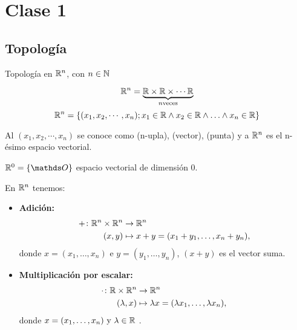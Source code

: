 \chapter{Clase 1}

\section{Topología}

Topología en $\mathbb{R}^{n}$, con $n \in \mathbb{N}$

$$
	\mathbb{R}^{n} =  \underbrace{\mathbb{R} \times \mathbb{R} \times \cdots \mathbb{R} }_{n \text{veces}}
$$
$$
	\mathbb{R}^{n} = \{ (x_1, x_2, \cdots, x_n); x_1 \in \mathbb{R} \wedge  x_2 \in \mathbb{R} \wedge
	\ldots  \wedge  x_n \in \mathbb{R}       \}
$$

Al $(x_1, x_2, \cdots, x_n) $  se conoce como (n-upla), (vector), (punta) y a $\mathbb{R}^{n}$ es el n-ésimo espacio vectorial.

$\Real{0} = \{\Ou\}$  espacio vectorial de dimensión $0$.

En $\mathbb{R}^{n}$ tenemos:

\begin{itemize}
	\item \textbf{Adición:}
	      \begin{align*}
		      +\colon \mathbb{R}^{n} \times \mathbb{R}^{n} & \to \mathbb{R}^{n}                                        \\
		      (x, y)                 & \mapsto x + y = (x_1 + y_1, \dots, x_n + y_n),
	      \end{align*}
	      donde $x = (x_1, \dots, x_n)$ e $y = (y_1, \dots, y_n)$, $(x+y)$ es el vector suma.

	\item \textbf{Multiplicación por escalar:}
	      \begin{align*}
		      \cdot\colon \mathbb{R} \times \mathbb{R}^{n} & \to \mathbb{R}^{n}                                                \\
		      (\lambda, x)              & \mapsto \lambda x = (\lambda x_1, \dots, \lambda x_n),
	      \end{align*}
	      donde $x = (x_1, \dots, x_n) \text{ y } \lambda \in \mathbb{R}$ .
\end{itemize}




